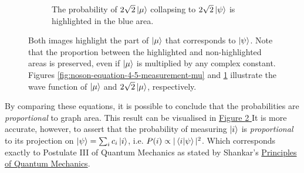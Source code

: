 \begin{figure}[htb]
\begin{subfigure}[t]{0.45\textwidth}
        \caption{The probability of $2 \sqrt 2 \ket \mu$ collapsing to $2 \sqrt 2 \ket \psi$ is
            highlighted in the blue area.}
        \label{fig:noson-equation-4-5-measurement-2-sqrt2-mu}
    \end{subfigure}
    \captionsetup{width=0.9\textwidth}
    \caption{Both images highlight the part of $\ket \mu$ that corresponds to $\ket \psi$.
        Note that the proportion between the highlighted and non-highlighted areas is preserved,
        even if $\ket \mu$ is multiplied by any complex constant.
        Figures \ref{fig:noson-equation-4-5-measurement-mu} and
        \ref{fig:noson-equation-4-5-measurement-2-sqrt2-mu}
        illustrate the wave function of
        $\ket \mu$ and $2 \sqrt2 \ket \mu$, respectively.}
    \label{fig:noson-equation-4-5-measurement-probabilities}
\end{figure}

By comparing these equations,
it is possible to conclude that
the probabilities are \emph{proportional} to graph area.
This result can be visualised in
\hyperref[fig:noson-equation-4-5-measurement-probabilities]{
    Figure \ref{fig:noson-equation-4-5-measurement-probabilities}
}
It is more accurate, however, to assert that
the probability of measuring $\ket i$ is \emph{proportional}
to its projection on $\ket \psi = \sum_i c_i \ket i$,
i.e. $P(i) \propto |\mathop{\mathinner{ \langle{i}|{\psi}\rangle}} |^2$.
Which corresponds exactly to Postulate III of Quantum Mechanics as stated by
Shankar's \href{https://www.springer.com/br/book/9780306447907}{Principles of Quantum Mechanics}.